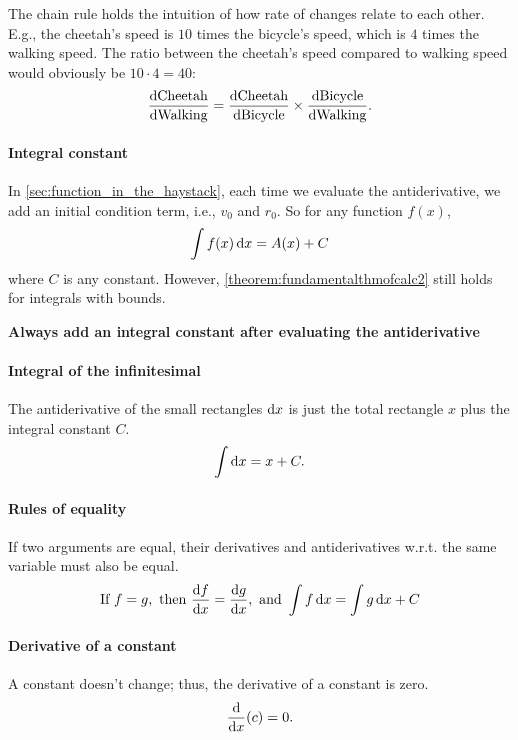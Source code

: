 The chain rule holds the intuition of how rate of changes relate to each other. E.g., the cheetah's speed is $10$ times the bicycle's speed, which is $4$ times the walking speed. The ratio between the cheetah's speed compared to walking speed would obviously be $10\cdot 4 = 40$:
\begin{equation}
    \odv{\textrm{Cheetah}}{\textrm{Walking}} = \odv{\textrm{Cheetah}}{\textrm{Bicycle}} \times \odv{\textrm{Bicycle}}{\textrm{Walking}}.
\end{equation}

\paragraph{Integral constant} In \cref{sec:function_in_the_haystack}, each time we evaluate the antiderivative, we add an initial condition term, i.e., $v_0$ and $r_0$. So for any function $f(x)$,
\begin{equation}
    \int f(x)\odif{x} = A(x) + C
\end{equation}
where $C$ is any constant. However, \cref{theorem:fundamentalthmofcalc2} still holds for integrals with bounds.
\begin{center}
	\textbf{
		\large Always add an integral constant after evaluating the antiderivative
	}
\end{center}

\paragraph{Integral of the infinitesimal} The antiderivative of the small rectangles $\odif{x}$ is just the total rectangle $x$ plus the integral constant $C$. 
\begin{equation}
    \int \odif{x} = x + C.
\end{equation}

\paragraph{Rules of equality} If two arguments are equal, their derivatives and antiderivatives w.r.t. the same variable must also be equal.
\begin{equation*}
    \textrm{If}~f = g,\textrm{ then }\odv{f}{x} = \odv{g}{x},\textrm{ and }\int f\odif{x} = \int g\odif{x} + C
\end{equation*}

\paragraph{Derivative of a constant} A constant doesn't change; thus, the derivative of a constant is zero. 
\begin{equation}
    \odv*{(c)}{x} = 0.
\end{equation}

